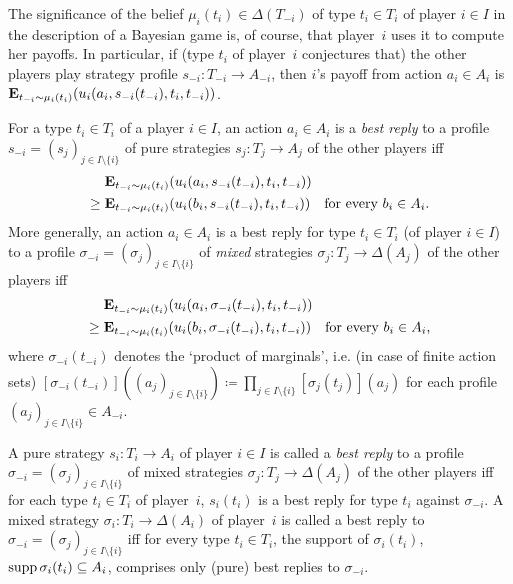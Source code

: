 \documentclass[11pt,letterpaper,reqno,oneside]{book}
\begin{document}
The significance of the belief $\mu_i(t_i) \in \Delta(T_{-i})$ of type $t_i \in T_i$ of player $i \in I$ in the description of a Bayesian game is, of course, that player~$i$ uses it to compute her payoffs. In particular, if (type $t_i$ of player~$i$ conjectures that) the other players play strategy profile $s_{-i} : T_{-i} \to A_{-i}$, then $i$'s payoff from action $a_i \in A_i$ is $\E_{t_{-i} \sim \mu_i(t_i)} \left( u_i(a_i,s_{-i}(t_{-i}),t_i,t_{-i}) \right)$.

For a type $t_i \in T_i$ of a player $i \in I$, an action $a_i \in A_i$ is a \emph{best reply} to a profile $s_{-i} = (s_j)_{j \in I \setminus \{i\}}$ of pure strategies $s_j : T_j \to A_j$ of the other players iff
%
\begin{align*}
	{}&\E_{t_{-i} \sim \mu_i(t_i)} \left( u_i(a_i,s_{-i}(t_{-i}),t_i,t_{-i}) \right)
	\\
	\geq{} &\E_{t_{-i} \sim \mu_i(t_i)} \left( u_i(b_i,s_{-i}(t_{-i}),t_i,t_{-i}) \right)
	\quad \text{for every $b_i \in A_i$.}
\end{align*}
%
More generally, an action $a_i \in A_i$ is a best reply for type $t_i \in T_i$ (of player $i \in I$) to a profile $\sigma_{-i} = (\sigma_j)_{j \in I \setminus \{i\}}$ of \emph{mixed} strategies $\sigma_j : T_j \to \Delta(A_j)$ of the other players iff
%
\begin{align*}
	{}&\E_{t_{-i} \sim \mu_i(t_i)} \left( u_i(a_i,\sigma_{-i}(t_{-i}),t_i,t_{-i}) \right)
	\\
	\geq{} &\E_{t_{-i} \sim \mu_i(t_i)} \left( u_i(b_i,\sigma_{-i}(t_{-i}),t_i,t_{-i}) \right)
	\quad \text{for every $b_i \in A_i$,}
\end{align*}
%
where $\sigma_{-i}(t_{-i})$ denotes the `product of marginals', i.e. (in case of finite action sets) $[\sigma_{-i}(t_{-i})]((a_j)_{j \in I \setminus \{i\}}) \coloneqq \prod_{j \in I \setminus \{i\}} [\sigma_j(t_j)](a_j)$ for each profile $(a_j)_{j \in I \setminus \{i\}} \in A_{-i}$.

A pure strategy $s_i : T_i \to A_i$ of player $i \in I$ is called a \emph{best reply} to a profile $\sigma_{-i} = (\sigma_j)_{j \in I \setminus \{i\}}$ of mixed strategies $\sigma_j : T_j \to \Delta(A_j)$ of the other players iff for each type $t_i \in T_i$ of player~$i$, $s_i(t_i)$ is a best reply for type $t_i$ against $\sigma_{-i}$. A mixed strategy $\sigma_i : T_i \to \Delta(A_i)$ of player~$i$ is called a best reply to $\sigma_{-i} = (\sigma_j)_{j \in I \setminus \{i\}}$ iff for every type $t_i \in T_i$, the support of $\sigma_i(t_i)$, $\operatorname*{supp} \sigma_i(t_i) \subseteq A_i$, comprises only (pure) best replies to $\sigma_{-i}$.
\end{document}
